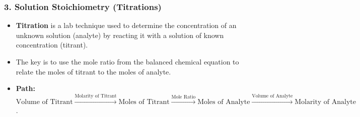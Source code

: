 \documentclass{article}
\begin{document}
\bigskip
\subsubsection*{3. Solution Stoichiometry (Titrations)}
\begin{itemize}[itemsep=5pt]
    \item \textbf{Titration} is a lab technique used to determine the concentration of an unknown solution (analyte) by reacting it with a solution of known concentration (titrant).
    \item The key is to use the mole ratio from the balanced chemical equation to relate the moles of titrant to the moles of analyte.
    \item \textbf{Path:} $\text{Volume of Titrant} \xrightarrow{\text{Molarity of Titrant}} \text{Moles of Titrant} \xrightarrow{\text{Mole Ratio}} \text{Moles of Analyte} \xrightarrow{\text{Volume of Analyte}} \text{Molarity of Analyte}$.
\end{itemize}
\end{document}
